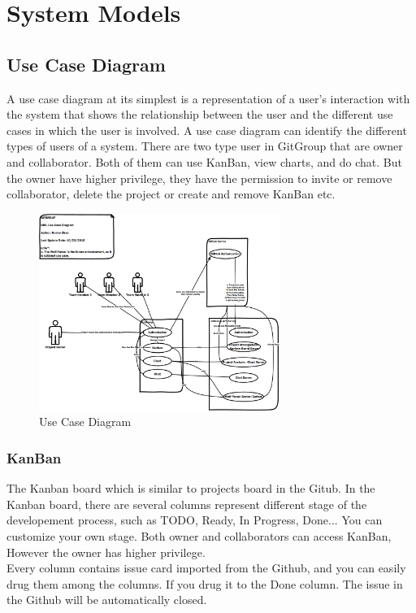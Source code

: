 \documentclass[12pt,a4paper]{report}
\begin{document}
\chapter{System Models}
\section{Use Case Diagram}
A use case diagram at its simplest is a representation of a user's interaction with the system that shows the relationship between the user and the different use cases in which the user is involved. A use case diagram can identify the different types of users of a system. There are two type user in GitGroup that are owner and collaborator. Both of them can use KanBan, view charts, and do chat. But the owner have higher privilege, they have the permission to invite or remove collaborator, delete the project or create and remove KanBan etc.
\begin{figure}[H]
	\centering
	\includegraphics[width=0.7\textwidth]{./pics/UseCaseDiagram.png}
	\caption{Use Case Diagram}
\end{figure}
\subsection{KanBan}
The Kanban board which is similar to projects board in the Gitub. In the Kanban board, there are several columns represent different stage of the developement process, such as TODO, Ready, In Progress, Done... You can customize your own stage. Both owner and collaborators can access KanBan, However the owner has higher privilege.\\
Every column contains issue card imported from the Github, and you can easily drug them among the columns. If you drug it to the Done column. The issue in the Github will be automatically closed.\cite{zube}
\end{document}

